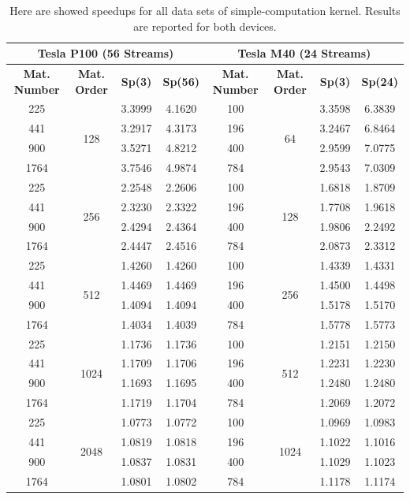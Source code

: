 \begin{table}	
	\centering
	\begin{tabular}{ | c | c | c | c  || c | c | c | c | } 
		\hline
		\multicolumn{4}{c}{\textbf{Tesla P100 (56 Streams)}} & \multicolumn{4}{c}{\textbf{Tesla M40 (24 Streams)}}\\ [0.5ex]
		\hline\hline
		\textbf{Mat. Number}  & \textbf{Mat. Order} & \textbf{Sp(3)} & \textbf{Sp(56)} & \textbf{Mat. Number}  & \textbf{Mat. Order}  & \textbf{Sp(3)} & \textbf{Sp(24)} \\
		\hline
		
		
		225& \multirow{4}{*}{128}&	3.3999&	4.1620&	100&	\multirow{4}{*}{64}&	3.3598&	6.3839\\
		441& &	3.2917&	4.3173&	196&	&	3.2467&	6.8464\\
		900& &	3.5271&	4.8212&	400&	&	2.9599&	7.0775\\
		1764& &	3.7546&	4.9874&	784&	&	2.9543&	7.0309\\
		\hline
		225& \multirow{4}{*}{256}&	2.2548&	2.2606&	100& \multirow{4}{*}{128}& 1.6818&	1.8709\\
		441& & 2.3230&	2.3322&	196& & 1.7708& 1.9618\\
		900& & 2.4294&	2.4364&	400& & 1.9806&	2.2492\\
		1764& &	2.4447&	2.4516&	784& & 2.0873&	2.3312\\
		\hline
		225& \multirow{4}{*}{512}&	1.4260&	1.4260&	100& \multirow{4}{*}{256}&	1.4339&	1.4331\\
		441& &	1.4469&	1.4469&	196&  & 1.4500&	1.4498\\
		900& &	1.4094&	1.4094&	400& &	1.5178&	1.5170\\
		1764& &	1.4034&	1.4039&	784& &	1.5778&	1.5773\\
		\hline
		225& \multirow{4}{*}{1024}&	1.1736&	1.1736&	100&	\multirow{4}{*}{512}&	1.2151&	1.2150\\
		441& &	1.1709&	1.1706&	196& & 1.2231&	1.2230\\
		900& &	1.1693&	1.1695&	400& &	1.2480&	1.2480\\
		1764& &	1.1719&	1.1704&	784& &	1.2069&	1.2072\\
		\hline
		225& \multirow{4}{*}{2048}&	1.0773&	1.0772&	100&	\multirow{4}{*}{1024}&	1.0969&	1.0983\\
		441& &	1.0819&	1.0818&	196& &	1.1022&	1.1016\\
		900& &	1.0837&	1.0831&	400& &	1.1029&	1.1023\\
		1764& &	1.0801&	1.0802&	784& &	1.1178&	1.1174\\
		
		\hline
		
		
	\end{tabular}
	\caption{Here are showed speedups for all data sets of simple-computation kernel. Results are reported for both devices.}	
	\label{tab:matspeedup}		
\end{table}
